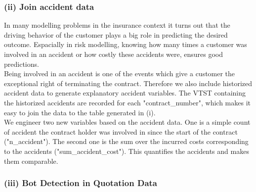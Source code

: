 \documentclass[12pt,titlepage]{article}
\begin{document}
\subsubsection*{(ii) Join accident data}
In many modelling problems in the insurance context it turns out that the driving behavior of the customer plays a big role in predicting the desired outcome. Espacially in risk modelling, knowing how many times a customer was involved in an accident or how costly these accidents were, ensures good predictions. \\
Being involved in an accident is one of the events which give a customer the exceptional right of terminating the contract. Therefore we also include historized accident data to generate explanatory accident variables. The VTST containing the historized accidents are recorded for each "contract\_number", which makes it easy to join the data to the table generated in (i). \\
We engineer two new variables based on the accident data. One is a simple count of accident the contract holder was involved in since the start of the contract ("n\_accident"). The second one is the sum over the incurred costs corresponding to the accidents ("sum\_accident\_cost"). This quantifies the accidents and makes them comparable. \\


\subsubsection*{(iii) Bot Detection in Quotation Data}
\end{document}

